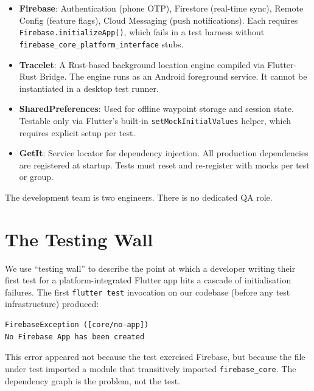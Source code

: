 \documentclass[10pt,journal,compsoc]{IEEEtran}
\begin{document}
\begin{itemize}
  \item \textbf{Firebase}: Authentication (phone OTP), Firestore (real-time
        sync), Remote Config (feature flags), Cloud Messaging (push
        notifications). Each requires \texttt{Firebase.initializeApp()},
        which fails in a test harness without
        \texttt{firebase\_core\_platform\_interface} stubs.
  \item \textbf{Tracelet}: A Rust-based background location engine compiled
        via Flutter-Rust Bridge. The engine runs as an Android foreground
        service. It cannot be instantiated in a desktop test runner.
  \item \textbf{SharedPreferences}: Used for offline waypoint storage and
        session state. Testable only via Flutter's built-in
        \texttt{setMockInitialValues} helper, which requires explicit
        setup per test.
  \item \textbf{GetIt}: Service locator for dependency injection. All
        production dependencies are registered at startup. Tests must
        reset and re-register with mocks per test or group.
\end{itemize}

The development team is two engineers. There is no dedicated QA role.


\section{The Testing Wall}
\label{sec:wall}

We use ``testing wall'' to describe the point at which a developer writing
their first test for a platform-integrated Flutter app hits a cascade of
initialisation failures. The first \texttt{flutter test} invocation on our
codebase (before any test infrastructure) produced:

\begin{lstlisting}[language={},numbers=none]
FirebaseException ([core/no-app])
No Firebase App has been created
\end{lstlisting}

This error appeared not because the test exercised Firebase, but because
the file under test imported a module that transitively imported
\texttt{firebase\_core}. The dependency graph is the problem, not the test.
\end{document}
